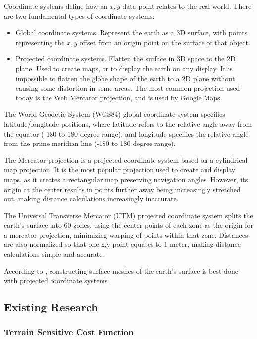 \documentclass[12pt]{article}
\begin{document}
Coordinate systems define how an $x,y$ data point relates to the real world. There are two fundamental types of coordinate systems:

\begin{itemize}
  \item Global coordinate systems. Represent the earth as a 3D surface, with points representing the $x,y$ offset from an origin point on the surface of that object.
  \item Projected coordinate systems. Flatten the surface in 3D space to the 2D plane. Used to create maps, or to display the earth on any display. It is impossible to flatten the globe shape of the earth to a 2D plane without causing some distortion in some areas. The most common projection used today is the Web Mercator projection, and is used by Google Maps.
\end{itemize}

The World Geodetic System (WGS84) global coordinate system specifies latitude/longitude positions, where latitude refers to the relative angle away from the equator (-180 to 180 degree range), and longitude specifies the relative angle from the prime meridian line (-180 to 180 degree range).

The Mercator projection is a projected coordinate system based on a cylindrical map projection. It is the most popular projection used to create and display maps, as it creates a rectangular map preserving navigation angles. However, its origin at the center results in points further away being increasingly stretched out, making distance calculations increasingly inaccurate.

The Universal Transverse Mercator (UTM) projected coordinate system splits the earth's surface into 60 zones, using the center points of each zone as the origin for a mercator projection, minimizing warping of points within that zone. Distances are also normalized so that one x,y point equates to 1 meter, making distance calculations simple and accurate.

According to \textcite{cgal:eb-24b}, constructing surface meshes of the earth's surface is best done with projected coordinate systems %

\subsection{Existing Research}

\subsubsection{Terrain Sensitive Cost Function}
\end{document}
